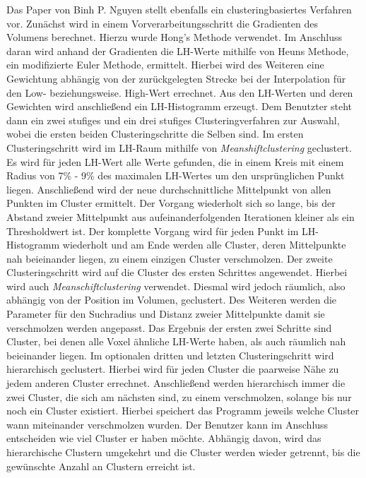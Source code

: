 Das Paper von Binh P. Nguyen \cite{nguyen2012clustering} stellt ebenfalls ein clusteringbasiertes Verfahren vor.
Zunächst wird in einem Vorverarbeitungsschritt die Gradienten des Volumens berechnet. Hierzu wurde Hong's Methode \cite{hong2003method} verwendet.
Im Anschluss daran wird anhand der Gradienten die LH-Werte mithilfe von Heuns Methode, ein modifizierte Euler Methode, ermittelt. Hierbei wird des Weiteren eine Gewichtung abhängig von der zurückgelegten Strecke bei der Interpolation für den Low- beziehungsweise. High-Wert errechnet. Aus den LH-Werten und deren Gewichten wird anschließend ein LH-Histogramm erzeugt.
\newline
Dem Benutzter steht dann ein zwei stufiges und ein drei stufiges Clusteringverfahren zur Auswahl, wobei die ersten beiden Clusteringschritte die Selben sind. 
Im ersten Clusteringschritt wird im LH-Raum mithilfe von \textit{Meanshiftclustering} geclustert. Es wird für jeden LH-Wert alle Werte gefunden, die in einem Kreis mit einem Radius von 7\% - 9\%  des maximalen LH-Wertes um den ursprünglichen Punkt liegen.
Anschließend wird der neue durchschnittliche Mittelpunkt von allen Punkten im Cluster ermittelt. Der Vorgang wiederholt sich so lange, bis der Abstand zweier Mittelpunkt aus aufeinanderfolgenden Iterationen kleiner als ein Thresholdwert ist.
Der komplette Vorgang wird für jeden Punkt im LH-Histogramm wiederholt und am Ende werden alle Cluster, deren Mittelpunkte nah beieinander liegen, zu einem einzigen Cluster verschmolzen.
\newline
Der zweite Clusteringschritt wird auf die Cluster des ersten Schrittes angewendet. Hierbei wird auch \textit{Meanschiftclustering} verwendet. Diesmal wird jedoch räumlich, also abhängig von der Position im Volumen, geclustert. Des Weiteren werden die Parameter für den Suchradius und Distanz zweier Mittelpunkte damit sie verschmolzen werden angepasst.
Das Ergebnis der ersten zwei Schritte sind Cluster, bei denen alle Voxel ähnliche LH-Werte haben, als auch räumlich nah beieinander liegen.
\newline
Im optionalen dritten und letzten Clusteringschritt wird hierarchisch geclustert. Hierbei wird für jeden Cluster die paarweise Nähe zu jedem anderen Cluster errechnet.
Anschließend werden hierarchisch immer die zwei Cluster, die sich am nächsten sind, zu einem verschmolzen, solange bis nur noch ein Cluster existiert.
Hierbei speichert das Programm jeweils welche Cluster wann miteinander verschmolzen wurden. Der Benutzer kann im Anschluss entscheiden wie viel Cluster er haben möchte. Abhängig davon, wird das hierarchische Clustern umgekehrt und die Cluster werden wieder getrennt, bis die gewünschte Anzahl an Clustern erreicht ist.


